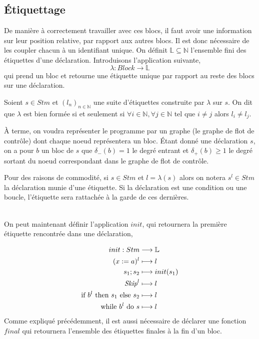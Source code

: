 \documentclass[a4paper, 11pt]{article}
\begin{document}
\subsection{Étiquettage}
De manière à correctement travailler avec ces blocs, il faut avoir une information sur leur position relative, par rapport
aux autres blocs. Il est donc nécessaire de les coupler chacun à un identifiant unique. 
On définit $\mathbb{L}\subseteq\mathbb{N}$ l'ensemble fini des étiquettes d'une déclaration. Introduisons l'application suivante,
\[
	\lambda: Block \longrightarrow \mathbb{L}
\]
\newline
qui prend un bloc et retourne une étiquette unique par rapport au reste des blocs sur une déclaration.
\newline
\newline
\begin{definition}
	Soient $s \in Stm$ et $(l_n)_{n\in\mathbb{N}}$ une suite d'étiquettes construite par $\lambda$ sur $s$.
	On dit que $\lambda$ est bien formée si et seulement si $\forall i \in \mathbb{N}, \forall j \in \mathbb{N}$ 
	tel que $i \neq j$ alors $l_i \neq l_j$.
\end{definition}
\newline
À terme, on voudra représenter le programme par un graphe (le graphe de flot de contrôle) dont chaque noeud représentera un bloc. 
Étant donné une déclaration $s$, on a pour  $b$ un bloc de $s$ que $\delta_-(b) = 1$ le degré entrant et $\delta_+(b) \ge 1$ 
le degré sortant du noeud correspondant dans le graphe de flot de contrôle.
\\
\begin{notation}
	Pour des raisons de commodité, si $s \in Stm$ et $l = \lambda(s)$ alors on notera $s^l \in Stm$ la déclaration munie d'une étiquette.
	Si la déclaration est une condition ou une boucle, l'étiquette sera rattachée à la garde de ces dernières.
\end{notation}
\\
On peut maintenant définir l'application $init$, qui retournera la première étiquette rencontrée dans une déclaration,

\begin{align*}
	init : Stm &\longrightarrow \mathbb{L}\\
	({x}\space:=\space{a})^l &\longmapsto l\\
	{s_1}\space;\space{s_2} &\longmapsto init(s_1)\\
	{\textit{Skip}}^l &\longmapsto l\\
	\text{if }{b^l}\text{ then }{s_1}\text{ else }{s_2} &\longmapsto l\\
	\text{while }{b^l}\text{ do }{s} &\longmapsto l
\end{align*}
Comme expliqué précédemment, il est aussi nécessaire de déclarer une fonction $final$ qui retournera l'ensemble des étiquettes finales 
à la fin d'un bloc.
\end{document}
